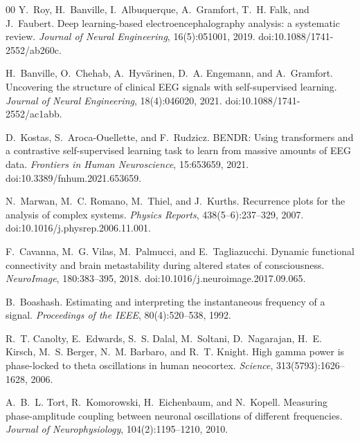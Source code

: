 \documentclass[5p,twocolumn,authoryear]{elsarticle}
\begin{document}
\begin{thebibliography}{00}
Y.~Roy, H.~Banville, I.~Albuquerque, A.~Gramfort, T.~H. Falk, and J.~Faubert.
\newblock Deep learning-based electroencephalography analysis: a systematic review.
\newblock \emph{Journal of Neural Engineering}, 16(5):051001, 2019.
\newblock doi:10.1088/1741-2552/ab260c.

H.~Banville, O.~Chehab, A.~Hyv{\"a}rinen, D.~A. Engemann, and A.~Gramfort.
\newblock Uncovering the structure of clinical EEG signals with self-supervised learning.
\newblock \emph{Journal of Neural Engineering}, 18(4):046020, 2021.
\newblock doi:10.1088/1741-2552/ac1abb.

D.~Kostas, S.~Aroca-Ouellette, and F.~Rudzicz.
\newblock BENDR: Using transformers and a contrastive self-supervised learning task to learn from massive amounts of EEG data.
\newblock \emph{Frontiers in Human Neuroscience}, 15:653659, 2021.
\newblock doi:10.3389/fnhum.2021.653659.

N.~Marwan, M.~C. Romano, M.~Thiel, and J.~Kurths.
\newblock Recurrence plots for the analysis of complex systems.
\newblock \emph{Physics Reports}, 438(5--6):237--329, 2007.
\newblock doi:10.1016/j.physrep.2006.11.001.

F.~Cavanna, M.~G. Vilas, M.~Palmucci, and E.~Tagliazucchi.
\newblock Dynamic functional connectivity and brain metastability during altered states of consciousness.
\newblock \emph{NeuroImage}, 180:383--395, 2018.
\newblock doi:10.1016/j.neuroimage.2017.09.065.

B.~Boashash.
\newblock Estimating and interpreting the instantaneous frequency of a signal.
\newblock \emph{Proceedings of the IEEE}, 80(4):520--538, 1992.

R.~T. Canolty, E.~Edwards, S.~S. Dalal, M.~Soltani, D.~Nagarajan, H.~E. Kirsch, M.~S. Berger, N.~M. Barbaro, and R.~T. Knight.
\newblock High gamma power is phase-locked to theta oscillations in human neocortex.
\newblock \emph{Science}, 313(5793):1626--1628, 2006.

A.~B.~L. Tort, R.~Komorowski, H.~Eichenbaum, and N.~Kopell.
\newblock Measuring phase-amplitude coupling between neuronal oscillations of different frequencies.
\newblock \emph{Journal of Neurophysiology}, 104(2):1195--1210, 2010.


\end{thebibliography}
\end{document}

